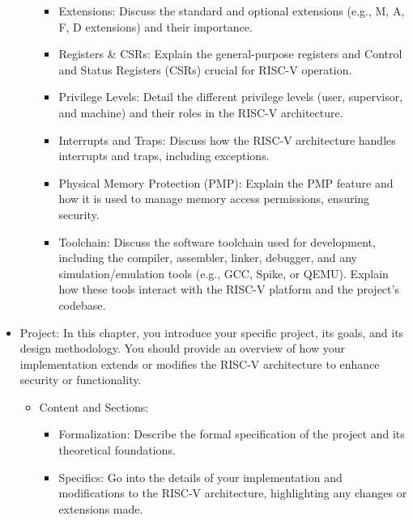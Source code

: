 \begin{itemize}
\begin{itemize}
\begin{itemize}
          \item Extensions: Discuss the standard and optional extensions (e.g., M,
            A, F, D extensions) and their importance.

          \item Registers \& CSRs: Explain the general-purpose registers and
            Control and Status Registers (CSRs) crucial for RISC-V operation.

          \item Privilege Levels: Detail the different privilege levels (user,
            supervisor, and machine) and their roles in the RISC-V architecture.

          \item Interrupts and Traps: Discuss how the RISC-V architecture
            handles interrupts and traps, including exceptions.

          \item Physical Memory Protection (PMP): Explain the PMP feature and
            how it is used to manage memory access permissions, ensuring security.

          \item Toolchain: Discuss the software toolchain used for development, including
            the compiler, assembler, linker, debugger, and any simulation/emulation
            tools (e.g., GCC, Spike, or QEMU). Explain how these tools interact
            with the RISC-V platform and the project’s codebase.
        \end{itemize}
    \end{itemize}

  \item Project: In this chapter, you introduce your specific project, its goals,
    and its design methodology. You should provide an overview of how your
    implementation extends or modifies the RISC-V architecture to enhance
    security or functionality.
    \begin{itemize}
      \item Content and Sections:

        \begin{itemize}
          \item Formalization: Describe the formal specification of the project
            and its theoretical foundations.

          \item Specifics: Go into the details of your implementation and
            modifications to the RISC-V architecture, highlighting any changes or
            extensions made.


\end{itemize}
\end{itemize}
\end{itemize}
